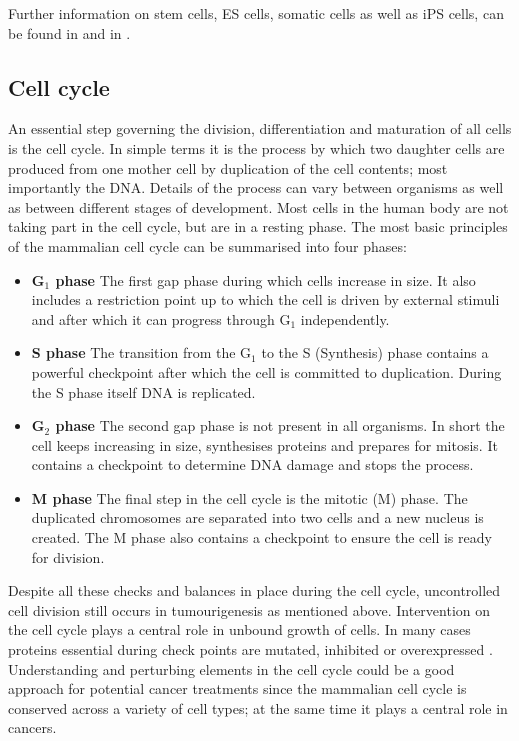 Further information on stem cells, ES cells, somatic cells as well as iPS cells, can be found in \cite{lanza2009essentials} and in \cite{Lanza:2013uk}.

\subsection{Cell cycle}
\label{sec:cell-cycle}

An essential step governing the division, differentiation and maturation of all cells is the cell cycle. In simple terms it is the process by which two daughter cells are produced from one mother cell by duplication of the cell contents; most importantly the DNA. Details of the process can vary between organisms as well as between different stages of development. Most cells in the human body are not taking part in the cell cycle, but are in a resting phase. The most basic principles of the mammalian cell cycle can be summarised into four phases:

\begin{itemize}
\item {\bf G$_1$ phase} The first gap phase during which cells increase in size. It also includes a restriction point up to which the cell is driven by external stimuli and after which it can progress through G$_1$ independently.
\item {\bf S phase} The transition from the G$_1$ to the S (Synthesis) phase contains a powerful checkpoint after which the cell is committed to duplication. During the S phase itself DNA is replicated.
\item {\bf G$_2$ phase} The second gap phase is not present in all organisms. In short the cell keeps increasing in size, synthesises proteins and prepares for mitosis. It contains a checkpoint to determine DNA damage and stops the process.
\item {\bf M phase} The final step in the cell cycle is the mitotic (M) phase. The duplicated chromosomes are separated into two cells and a new nucleus is created. The M phase also contains a checkpoint to ensure the cell is ready for division.
\end{itemize}

Despite all these checks and balances in place during the cell cycle, uncontrolled cell division  still occurs in tumourigenesis as mentioned above. Intervention on the cell cycle plays a central role in unbound growth of cells. In many cases proteins essential during check points are mutated, inhibited or overexpressed \citep{Williams:2012eg}. Understanding and perturbing elements in the cell cycle could be a good approach for potential cancer treatments since the mammalian cell cycle is conserved across a variety of cell types; at the same time it plays a central role in cancers.

